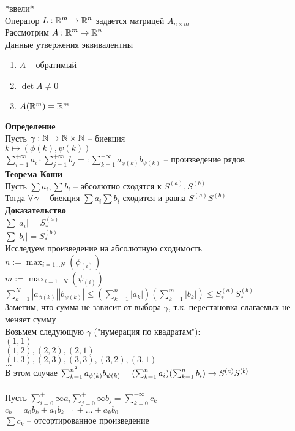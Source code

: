 \documentclass[12pt]{article}
\begin{document}
*ввели*\\
Оператор $L: \mathbb{R}^m \rightarrow \mathbb{R}^n$ задается матрицей $A_{n\times m}$\\
Рассмотрим $A: \mathbb{R}^m \rightarrow \mathbb{R}^n$\\
Данные утвержения эквивалентны\\
\begin{enumerate}
    \item $A$ -- обратимый
    \item $\det A\neq 0$
    \item $A(\mathbb{R}^m) = \mathbb{R}^m$
\end{enumerate}
\textbf{Определение}\\
Пусть $\gamma: \mathbb{N} \rightarrow \mathbb{N} \times \mathbb{N}$ -- биекция\\
$k \mapsto (\phi(k), \psi(k))$\\
$\sum_{i=1}^{+\infty} a_i \cdot \sum_{j=1}^{+\infty} b_j =: \sum_{k=1}^{+\infty} a_{\phi(k)}b_{\psi(k)}$ -- произведение рядов\\
\textbf{Теорема Коши}\\
Пусть $\sum a_i, \sum b_i$ -- абсолютно сходятся к $S^{(a)}, S^{(b)}$\\
Тогда $\forall\, \gamma$ -- биекция $\sum a_i \sum b_i$ сходится и равна $S^{(a)}S^{(b)}$\\
\textbf{Доказательство}\\
$\sum |a_i| = S^{(a)}_*$\\
$\sum |b_i| = S^{(b)}_*$\\
Исследуем произведение на абсолютную сходимость\\
$n:= \max_{i = 1\ldots N}(\phi_(i))$\\
$m:= \max_{i = 1\ldots N}(\psi_(i))$\\
$\sum_{k=1}^N |a_{\phi(k)}||b_{\psi(k)}| \leq (\sum_{k=1}^n |a_k|)(\sum_{k=1}^m |b_k|) \leq S_*^{(a)}S_*^{(b)}$\\
Заметим, что сумма не зависит от выбора $\gamma$, т.к. перестановка слагаемых не меняет сумму\\
Возьмем следующую $\gamma$ ("нумерация по квадратам"):\\
$(1, 1)$\\
$(1, 2), (2, 2), (2, 1)$\\
$(1, 3), (2, 3), (3, 3), (3, 2), (3,1)$\\
$\ldots$\\
В этом случае $\sum_{k=1}^{n^2} a_{\phi(k)}b_{\psi(k)} = (\sum_{k=1}^n a_i)(\sum_{k=1}^n b_i) \rightarrow S^{(a)}S^{(b)}$\\\\
Пусть $\sum_{i=0}^+\infty a_i \sum_{j=0}^+\infty b_j = \sum_{k=0}^{+\infty} c_k$\\
$c_k = a_0b_k + a_1b_{k-1} + \ldots + a_kb_0$\\
$\sum c_k$ -- отсортированное произведение\\
\end{document}
